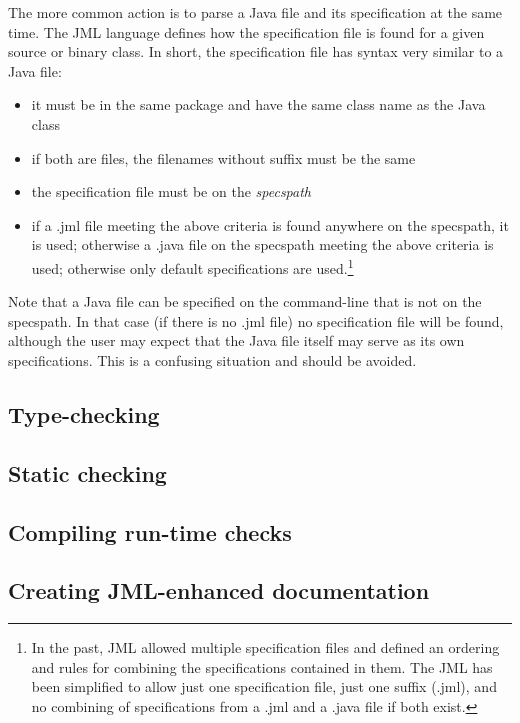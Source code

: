 The more common action is to parse a Java file and its specification at the same time. The JML language defines how the specification file is found for a given source or binary class. In short, the specification file has syntax very similar to 
a Java file:
\begin{itemize}
\item it must be in the same package and have the same class name as the Java class
\item if both are files, the filenames without suffix must be the same
\item the specification file must be on the {\em specspath}
\item if a .jml file meeting the above criteria is found anywhere on the specspath, it is used; otherwise a .java file on the specspath meeting
the above criteria is used; otherwise only default specifications are used.\footnote{In the past, JML allowed multiple specification files and defined an ordering and rules for combining the specifications contained in them. The JML has been 
simplified to allow just one specification file, just one suffix (.jml), and no combining of specifications from a .jml and a .java file if both exist.}
\end{itemize}
Note that a Java file can be specified on the command-line that is not on the specspath. In that case (if there is no .jml file) 
no specification file will be found, although the user may expect that the Java file itself may serve as its own specifications.
This is a confusing situation and should be avoided.


\subsection{Type-checking}

\subsection{Static checking}

\subsection{Compiling run-time checks}

\subsection{Creating JML-enhanced documentation}

